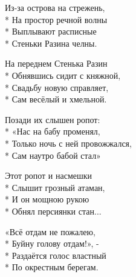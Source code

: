 \medskip

\begin{minipage}{\linewidth}
Из-за острова на стрежень,\\*
На простор речной волны\\*
Выплывают расписные\\*
Стеньки Разина челны.\\
\end{minipage}\par\medskip\nobreak

\medskip

\begin{minipage}{\linewidth}
На переднем Стенька Разин\\*
Обнявшись сидит с княжной,\\*
Свадьбу новую справляет,\\*
Сам весёлый и хмельной.\\
\end{minipage}\par\medskip\nobreak

\medskip

\begin{minipage}{\linewidth}
Позади их слышен ропот:\\*
«Нас на бабу променял,\\*
Только ночь с ней провожжался,\\*
Сам наутро бабой стал»\\
\end{minipage}\par\medskip\nobreak

\medskip

\begin{minipage}{\linewidth}
Этот ропот и насмешки\\*
Слышит грозный атаман,\\*
И он мощною рукою\\*
Обнял персиянки стан...\\
\end{minipage}\par\medskip\nobreak

\medskip

\begin{minipage}{\linewidth}
«Всё отдам не пожалею,\\*
Буйну голову отдам!», -\\*
Раздаётся голос властный\\*
По окрестным берегам.\\
\end{minipage}\par\medskip\nobreak

